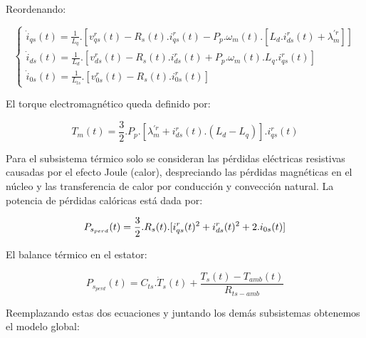 \documentclass{article}
\begin{document}
Reordenando:

\begin{equation}\label{eq:mi_ecuacion}
    \begin{cases}
        \dot{i}_{qs}(t) = \frac{1}{L_{q}}.[v_{qs}^r(t) - R_{s}(t).i_{qs}^r(t) - P_{p}.\omega_{m}(t).[L_{d}.i_{ds}^r(t) + \lambda_{m}^{\prime r}]]  \\
        \dot{i}_{ds}(t) = \frac{1}{L_{d}}.[v_{ds}^r(t) - R_{s}(t).i_{ds}^r(t) + P_{p}.\omega_{m}(t).L_{q}.i_{qs}^r(t)]  \\
        \dot{i}_{0s}(t) = \frac{1}{L_{ls}}.[v_{0s}^r(t) - R_{s}(t).i_{0s}^r(t)]
    \end{cases}
\end{equation}

El torque electromagnético queda definido por:

\begin{equation}\label{eq.torque_electromagnetico}
    T_{m}(t) = \frac{3}{2}.P_{p}.[\lambda_{m}^{\prime r}+i_{ds}^r(t).(L_{d}-L_{q})].i_{qs}^r(t)
\end{equation}

Para el subsistema térmico solo se consideran las pérdidas eléctricas resistivas causadas por el 
efecto Joule (calor), despreciando las pérdidas magnéticas en el núcleo y las transferencia de 
calor por conducción y convección natural. La potencia de pérdidas calóricas está dada por:

\begin{equation}
    P_{s_{perd}}(t) =  \frac{3}{2}.R_{s}(t).[i_{qs}^r(t)^2+i_{ds}^r(t)^2+2.i_{0s}(t)]\\
\end{equation}

El balance térmico en el estator:

\begin{equation}
    P_{s_{perd}}(t) = C_{ts}.\dot{T}_{s}(t) + \frac{T_{s}(t)-T_{amb}(t)}{R_{ts-amb}}
\end{equation}

Reemplazando estas dos ecuaciones y juntando los demás subsistemas obtenemos el modelo global:
\end{document}
